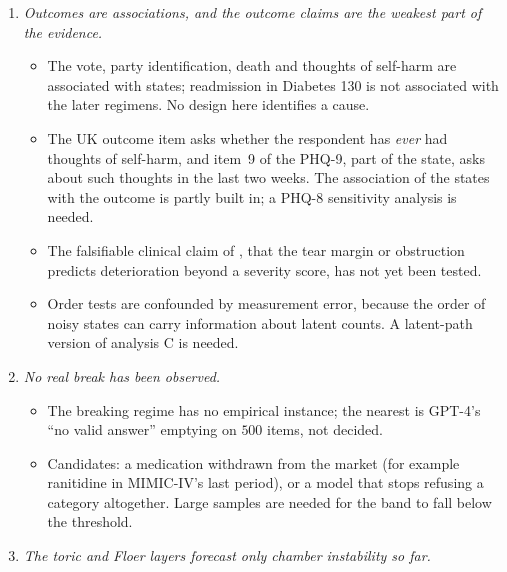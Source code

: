 \documentclass[11pt]{article}
\theoremstyle{definition}
\theoremstyle{remark}
\begin{document}
\begin{enumerate}[leftmargin=*]
\begin{itemize}[nosep]
    selection mechanism is the cause.
  \item Done: restricted selection models with their own nulls (\cref{sec:restricted}), now also in the MIMIC-IV kit. They test only what a
    model implies about the $(X,Y)$ composition of the measured. Selection within $(X,Y)$ cells, including missingness not at random, remains
    untestable from three tables; a fourth table that sees $Z$ directly is needed.
  \end{itemize}
\item \emph{Outcomes are associations, and the outcome claims are the weakest part of the evidence.}
  \begin{itemize}[nosep]
  \item The vote, party identification, death and thoughts of self-harm are associated with states; readmission in Diabetes 130 is not
    associated with the later regimens. No design here identifies a cause.
  \item The UK outcome item asks whether the respondent has \emph{ever} had thoughts of self-harm, and item~9 of the PHQ-9, part of the state,
    asks about such thoughts in the last two weeks. The association of the states with the outcome is partly built in; a PHQ-8
    sensitivity analysis is needed.
  \item The falsifiable clinical claim of \cite[\S11]{Bands}, that the tear margin or obstruction predicts deterioration beyond a severity
    score, has not yet been tested.
  \item Order tests are confounded by measurement error, because the order of noisy states can carry information about latent counts. A
    latent-path version of analysis C is needed.
  \end{itemize}
\item \emph{No real break has been observed.}
  \begin{itemize}[nosep]
  \item The breaking regime has no empirical instance; the nearest is GPT-4's ``no valid answer'' emptying on $500$ items, not decided.
  \item Candidates: a medication withdrawn from the market (for example ranitidine in MIMIC-IV's last period), or a model that stops refusing
    a category altogether. Large samples are needed for the band to fall below the threshold.
  \end{itemize}
\item \emph{The toric and Floer layers forecast only chamber instability so far.}
  \begin{itemize}[nosep]

\end{itemize}
\end{enumerate}
\end{document}
